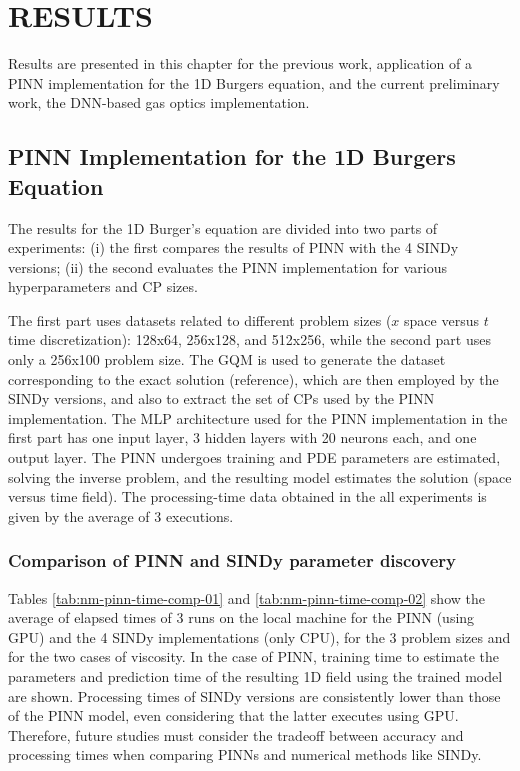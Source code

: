 \chapter{RESULTS}
\label{ch:resu}

Results are presented in this chapter for the previous work, application of a PINN implementation for the 1D Burgers equation, and the current preliminary work, the DNN-based gas optics implementation.


\section{PINN Implementation for the 1D Burgers Equation}

The results for the 1D Burger's equation are divided into two parts of experiments: 
(i) the first compares the results of PINN with the 4 SINDy versions; 
(ii) the second evaluates the PINN implementation for various hyperparameters and CP sizes.

The first part uses datasets related to different problem sizes ($x$ space versus $t$ time discretization): 128x64, 256x128, and 512x256, while the second part uses only a 256x100 problem size. The GQM is used to generate the dataset corresponding to the exact solution (reference), which are then employed by the SINDy versions, and also to extract the set of CPs used by the PINN implementation. The MLP architecture used for the PINN implementation in the first part has one input layer, 3 hidden layers with 20 neurons each, and one output layer. The PINN undergoes training and PDE parameters are estimated, solving the inverse problem, and the resulting model estimates the solution (space versus time field). The processing-time data obtained in the all experiments is given by the average of 3 executions. 

\subsection{Comparison of PINN and SINDy parameter discovery}

Tables \ref{tab:nm-pinn-time-comp-01} and \ref{tab:nm-pinn-time-comp-02} show  the average of elapsed times of 3 runs on the local machine for the PINN (using GPU) and the 4 SINDy implementations (only CPU), for the 3 problem sizes and for the two cases of viscosity.  In the case of PINN, training time to estimate the parameters and prediction time of the resulting 1D field using the trained model are shown. Processing times of SINDy versions are consistently lower than those of the PINN model, even considering that the latter executes using GPU. Therefore, future studies must consider the tradeoff between accuracy and processing times when comparing PINNs and numerical methods like SINDy. 

